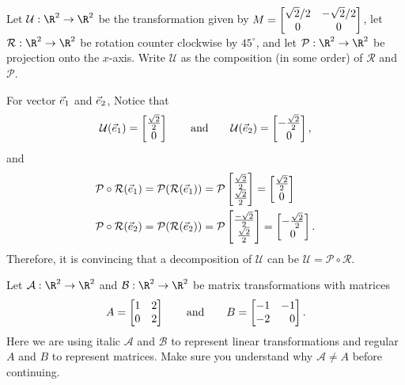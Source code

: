 \begin{example}
	Let $\mathcal U:\R^2\to\R^2$ be the transformation given by $M=\begin{bmatrix}\sqrt{2}/2&-\sqrt{2}/2\\0&0\end{bmatrix}$,
	let $\mathcal R:\R^2\to\R^2$ be rotation counter clockwise by $45^\circ$, and let $\mathcal P:\R^2\to\R^2$
	be projection onto the $x$-axis.
	Write $\mathcal U$ as the composition (in some order) of $\mathcal R$ and $\mathcal P$.

	For vector ${\vec e_1}$ and ${\vec e_2}$, Notice that
	\[
	    \mathcal U({\vec e_1})=\begin{bmatrix}\frac{\sqrt{2}}{2}\\0\end{bmatrix}\\\qquad\text{and}\qquad \mathcal U({\vec e_2})=\begin{bmatrix}-\frac{\sqrt{2}}{2}\\0\end{bmatrix},
	\]
	and
	\begin{align*}
	    \mathcal P\circ \mathcal R(\xhat)=\mathcal P(\mathcal R(\xhat))&=\mathcal P\mat{\frac{\sqrt{2}}{2}\\\frac{\sqrt{2}}{2}}=\matc{\frac{\sqrt{2}}{2}\\0}\\
	    \mathcal P\circ \mathcal R(\yhat)=\mathcal P(\mathcal R(\yhat))&=\mathcal P\matc{\frac{-\sqrt{2}}{2}\\\frac{\sqrt{2}}{2}}=\matc{-\frac{\sqrt{2}}{2}\\0}.
	\end{align*}
	Therefore, it is convincing that a decomposition of $\mathcal U$ can be $\mathcal U=\mathcal P\circ \mathcal R$.
\end{example}


Let $\mathcal A:\R^2\to\R^2$ and $\mathcal B:\R^2\to\R^2$ be matrix transformations with matrices
\[
	A=\mat{1&2\\0&2}\qquad\text{and}\qquad B=\mat{-1&-1\\-2&0}.
\]
Here we are using italic $\mathcal A$ and $\mathcal B$ to represent linear transformations and regular $A$ and $B$ to represent
matrices. Make sure you understand why $\mathcal A\neq A$ before continuing.


